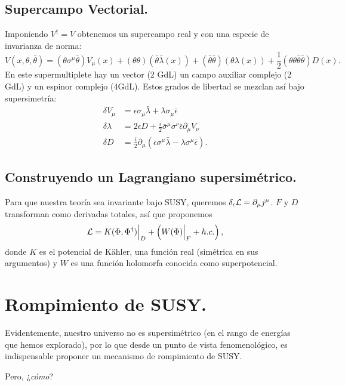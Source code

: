 \documentclass[10pt,a4paper]{beamer}
\begin{document}
\subsection{Supercampo Vectorial.}
\begin{frame}{\subsecname}
Imponiendo $V^\dag = V$ obtenemos un supercampo real y con una especie de
invarianza de norma:
\[
  V(x,\theta,\bar\theta) = 
  (\theta\sigma^\mu\bar\theta) V_\mu(x) +
  (\theta\theta)(\bar\theta\bar\lambda(x)) + 
  (\bar\theta\bar\theta)(\theta\lambda(x)) +
  \frac{1}{2}(\theta\theta\bar\theta\bar\theta) D(x).
\]
En este supermultiplete hay un vector (2 GdL) un campo auxiliar complejo (2 GdL)
y un espinor complejo (4GdL). Estos grados de libertad se mezclan así bajo
supersimetría:
\[
  \begin{aligned}
    \delta V_\mu &= \epsilon \sigma_\mu \bar\lambda +
    \lambda\sigma_\mu\bar\epsilon\\
    \delta \lambda &= {2}\epsilon D+
    \frac{i}{2}\bar\sigma^\mu\sigma^\nu\bar\epsilon \partial_\mu V_\nu\\
    \delta D    &= \frac{i}{2}\partial_\mu\left(\epsilon\sigma^\mu\bar\lambda
    -\lambda\sigma^\mu\bar\epsilon
  \right).
  \end{aligned}
\]
\end{frame}

\subsection{Construyendo un Lagrangiano supersimétrico.}
\begin{frame}{\subsecname}
  Para que nuestra teoría sea invariante bajo SUSY, queremos
$\delta_\epsilon \mathcal{L} = \partial_\mu j^\mu$.
$F$ y $D$ transforman como derivadas totales, así que proponemos
\[
  \mathcal{L}
  =
  K(\Phi,\Phi^\dag)\Big|_D + \left(W(\Phi)\Big|_F + h.c.\right),
\]
donde $K$ es el potencial de Kähler, una función real (simétrica en sus argumentos) y $W$ es una función
holomorfa conocida como superpotencial.

\end{frame}

\section{Rompimiento de SUSY.}
\begin{frame}{\secname}
  \label{sec:breaking}
  Evidentemente, nuestro universo no es supersimétrico (en el rango de energías
  que hemos explorado), por lo que desde un punto de vista fenomenológico, es
  indispensable proponer un mecanismo de rompimiento de SUSY.

Pero, ¿\emph{cómo}?

\end{frame}
\end{document}
